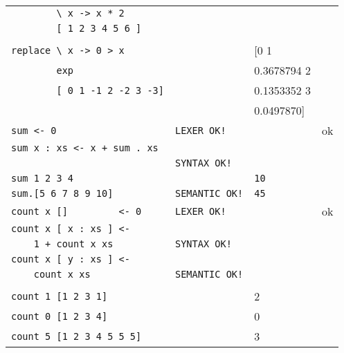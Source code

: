 \begin{longtable}[ht!]{|l|l|l|c|}
            \verb,        \ x -> x * 2,         &                    & & \\
            \verb,        [ 1 2 3 4 5 6 ],      &                    & & \\
                                                &                    & & \\
            \verb,replace \ x -> 0 > x,         &                    & [0 1 & \\
            \verb,        exp,                  &                    &  0.3678794 2& \\
            \verb,        [ 0 1 -1 2 -2 3 -3],  &                    &  0.1353352 3& \\
                                                &                    &  0.0497870]& \\ \hline

            \pagebreak

            \verb,sum <- 0,                  & \verb,LEXER OK!,   &                 & ok \\
            \verb,sum x : xs <- x + sum . xs,&                    &                 & \\
                                             & \verb,SYNTAX OK!,  &                 & \\
            \verb,sum 1 2 3 4,               &                    & \verb,10,       & \\
            \verb,sum.[5 6 7 8 9 10],        & \verb,SEMANTIC OK!,& \verb,45,       & \\ \hline

            \verb,count x []         <- 0,  & \verb,LEXER OK!,   & & ok \\
            \verb,count x [ x : xs ] <-,    &                    & & \\
            \verb,    1 + count x xs,       & \verb,SYNTAX OK!,  & & \\
            \verb,count x [ y : xs ] <-,    &                    & & \\
            \verb,    count x xs,           & \verb,SEMANTIC OK!,& & \\
                                            &                    & & \\
            \verb,count 1 [1 2 3 1],        &                    & 2 & \\
            \verb,count 0 [1 2 3 4],        &                    & 0 & \\
            \verb,count 5 [1 2 3 4 5 5 5],  &                    & 3 & \\ \hline
    \end{longtable}

